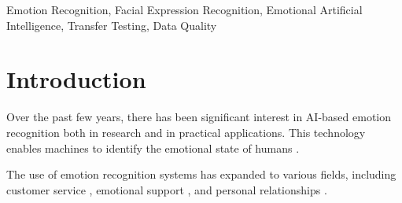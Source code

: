 \documentclass[a4paper, conference]{IEEEtran}
\begin{document}
\begin{IEEEkeywords}
Emotion Recognition, Facial Expression Recognition, Emotional Artificial Intelligence, Transfer Testing, Data Quality
\end{IEEEkeywords}


\section{Introduction}

Over the past few years, there has been significant interest in AI-based emotion recognition both in research and in practical applications. This technology enables machines to identify the emotional state of humans \cite{liDeepFacialExpression2020, melloukFacialEmotionRecognition2020}.


The use of emotion recognition systems has expanded to various fields, including customer service \cite{AffectivaHumanizingTechnology2021}, emotional support \cite{Replika2021}, and personal relationships \cite{davenportHowArtificialIntelligence2020,davoliDriverBehaviorRecognition2020,huangArtificialIntelligenceService2018}. %
\end{document}
